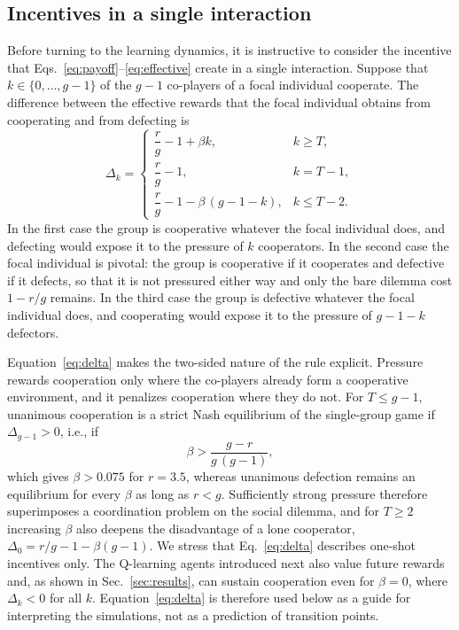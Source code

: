 \documentclass[%
  aip,cha,
  amsmath,amssymb,
  reprint,
  article-title,
]{revtex4-2}
\begin{document}
\subsection{Incentives in a single interaction}\label{sec:incentive}

Before turning to the learning dynamics, it is instructive to consider the incentive that Eqs.~\eqref{eq:payoff}--\eqref{eq:effective} create in a single interaction. Suppose that $k\in\{0,\dots,g-1\}$ of the $g-1$ co-players of a focal individual cooperate. The difference between the effective rewards that the focal individual obtains from cooperating and from defecting is
\begin{equation}
\Delta_k=
\begin{cases}
\dfrac{r}{g}-1+\beta k, & k\geq T,\\[1.5ex]
\dfrac{r}{g}-1, & k=T-1,\\[1.5ex]
\dfrac{r}{g}-1-\beta\,(g-1-k), & k\leq T-2.
\end{cases}
\label{eq:delta}
\end{equation}
In the first case the group is cooperative whatever the focal individual does, and defecting would expose it to the pressure of $k$ cooperators. In the second case the focal individual is pivotal: the group is cooperative if it cooperates and defective if it defects, so that it is not pressured either way and only the bare dilemma cost $1-r/g$ remains. In the third case the group is defective whatever the focal individual does, and cooperating would expose it to the pressure of $g-1-k$ defectors.

Equation~\eqref{eq:delta} makes the two-sided nature of the rule explicit. Pressure rewards cooperation only where the co-players already form a cooperative environment, and it penalizes cooperation where they do not. For $T\leq g-1$, unanimous cooperation is a strict Nash equilibrium of the single-group game if $\Delta_{g-1}>0$, i.e., if
\begin{equation}
\beta>\frac{g-r}{g\,(g-1)},
\label{eq:betastar}
\end{equation}
which gives $\beta>0.075$ for $r=3.5$, whereas unanimous defection remains an equilibrium for every $\beta$ as long as $r<g$. Sufficiently strong pressure therefore superimposes a coordination problem on the social dilemma, and for $T\geq2$ increasing $\beta$ also deepens the disadvantage of a lone cooperator, $\Delta_0=r/g-1-\beta(g-1)$. We stress that Eq.~\eqref{eq:delta} describes one-shot incentives only. The Q-learning agents introduced next also value future rewards and, as shown in Sec.~\ref{sec:results}, can sustain cooperation even for $\beta=0$, where $\Delta_k<0$ for all $k$. Equation~\eqref{eq:delta} is therefore used below as a guide for interpreting the simulations, not as a prediction of transition points.
\end{document}
